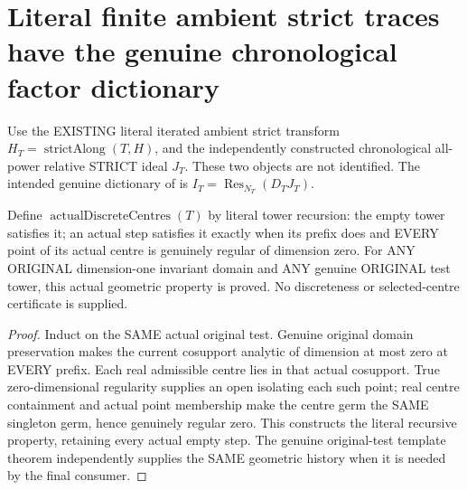\section{Literal finite ambient strict traces have the genuine chronological factor dictionary}

Use the EXISTING literal iterated ambient strict transform
$H_T=\operatorname{strictAlong}(T,H)$, and the independently constructed
chronological all-power relative STRICT ideal $J_T$. These two objects
are not identified. The intended genuine dictionary of
\cite[Remark~12.6, pp.~293--295]{bierstone-milman97-invent-math} is
$I_T=\operatorname{Res}_{N_T}(D_TJ_T)$.

\begin{lemma}
\label{hir:sharp-actual-original-domain-one-discrete-history}
\leanok
Define $\operatorname{actualDiscreteCentres}(T)$ by literal tower recursion:
the empty tower satisfies it; an actual step satisfies it exactly when
its prefix does and EVERY point of its actual centre is genuinely regular
of dimension zero. For ANY ORIGINAL dimension-one invariant domain and ANY
genuine ORIGINAL test tower, this actual geometric property is proved.
No discreteness or selected-centre certificate is supplied.
\end{lemma}
\begin{proof}
Induct on the SAME actual original test. Genuine original domain preservation
makes the current cosupport analytic of dimension at most zero at EVERY
prefix. Each real admissible centre lies in that actual cosupport. True
zero-dimensional regularity supplies an open isolating each such point;
real centre containment and actual point membership make the centre germ
the SAME singleton germ, hence genuinely regular zero. This constructs the
literal recursive property, retaining every actual empty step. The genuine
original-test template theorem independently supplies the SAME geometric
history when it is needed by the final consumer.
\end{proof}


